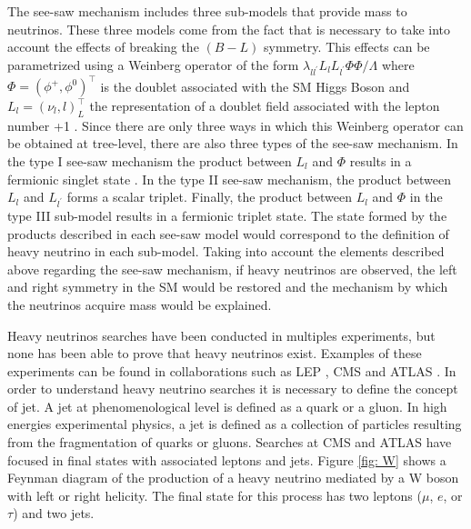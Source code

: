 The see-saw mechanism includes three sub-models that provide mass to neutrinos. These three models come from the fact that is necessary to take into account the effects of breaking the $(B-L)$ symmetry. This effects can be parametrized using a Weinberg operator of the form $\lambda_{ll^{\prime}}L_{l}L_{l^{\prime}}\Phi\Phi/\Lambda$ where $\Phi = (\phi^{+}, \phi^{0})^{\intercal}$ is the doublet associated with the SM Higgs Boson and $L_{l} = (\nu_{l},l)_{L}^{\intercal}$ the representation of a doublet field associated with the lepton number +1 \cite{See-saw}. Since there are only three ways in which this Weinberg operator can be obtained at tree-level, there are also three types of the see-saw mechanism. In the type I see-saw mechanism the product between $L_{l}$ and $\Phi$ results in a fermionic singlet state . In the type II see-saw mechanism, the product between $L_{l}$ and $L_{l^{\prime}}$ forms a scalar triplet. Finally, the product between $L_{l}$ and $\Phi$ in the type III sub-model results in a fermionic triplet state. The state formed by the products described in each see-saw model would correspond to the definition of heavy neutrino in each sub-model. Taking into account the elements described above regarding the see-saw mechanism, if heavy neutrinos are observed, the left and right symmetry in the SM would be restored and the mechanism by which the neutrinos acquire mass would be explained.

Heavy neutrinos searches have been conducted in multiples experiments, but none has been able to prove that heavy neutrinos exist. Examples of these experiments can be found in collaborations such as LEP \cite{LEP}, CMS and ATLAS \cite{CMS ATLAS}. In order to understand heavy neutrino searches it is necessary to define the concept of jet. A jet at phenomenological level is defined as a quark or a gluon. In high energies experimental physics, a jet is defined as a collection of particles resulting from the fragmentation of quarks or gluons. Searches at CMS and ATLAS have focused in final states with associated leptons and jets. Figure \ref{fig: W} shows a Feynman diagram of the production of a heavy neutrino mediated by a W boson with left or right helicity. The final state for this process has two leptons ($\mu$, $e$, or $\tau$) and two jets.

